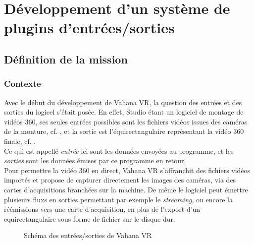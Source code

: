 \chapter{Développement d'un système de plugins d'entrées/sorties}

\section{Définition de la mission}
\subsection{Contexte}
Avec le début du développement de Vahana VR, la question des entrées et des sorties
du logicel s'était posée. En effet, Studio étant un logiciel de montage de vidéos
360, ses seules entrées possibles sont les fichiers vidéos issues des caméras de la monture,
cf. , et la sortie est l'équirectangulaire représentant
la vidéo 360 finale, cf. .\\
Ce qui est appellé \emph{entrée} ici sont les données envoyées au programme, et
les \emph{sorties} sont les données émises par ce programme en retour.\\
Pour permettre la vidéo 360 en direct, Vahana VR s'affranchit des fichiers
vidéos importés et propose de capturer directement les images des caméras, via
des cartes d'acquisitions branchées sur la machine. De même le logiciel peut émettre 
plusieurs fluxs en sorties permettant par exemple le \textit{streaming}, ou encore la réémissions vers
une carte d'acquisition, en plus de l'export d'un equirectangulaire sous forme de fichier
sur le disque dur.\\
\begin{figure}
  \centering
  \caption{Schéma des entrées/sorties de Vahana VR}
\end{figure}

